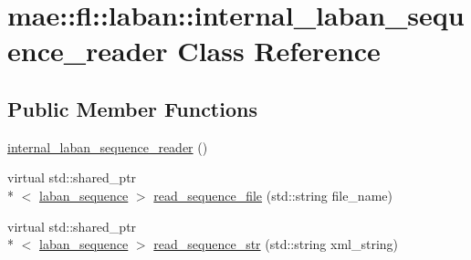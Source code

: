 \hypertarget{classmae_1_1fl_1_1laban_1_1internal__laban__sequence__reader}{\section{mae\-:\-:fl\-:\-:laban\-:\-:internal\-\_\-laban\-\_\-sequence\-\_\-reader Class Reference}
\label{classmae_1_1fl_1_1laban_1_1internal__laban__sequence__reader}
}
\subsection*{Public Member Functions}
\begin{DoxyCompactItemize}
\item 
\hyperlink{classmae_1_1fl_1_1laban_1_1internal__laban__sequence__reader_a80ff5a02252410d4dad9da17df4f5f2d}{internal\-\_\-laban\-\_\-sequence\-\_\-reader} ()
\item 
virtual std\-::shared\-\_\-ptr\\*
$<$ \hyperlink{classmae_1_1fl_1_1laban_1_1laban__sequence}{laban\-\_\-sequence} $>$ \hyperlink{classmae_1_1fl_1_1laban_1_1internal__laban__sequence__reader_ab05a0e062ca400073da5c09e03a5a499}{read\-\_\-sequence\-\_\-file} (std\-::string file\-\_\-name)
\item 
virtual std\-::shared\-\_\-ptr\\*
$<$ \hyperlink{classmae_1_1fl_1_1laban_1_1laban__sequence}{laban\-\_\-sequence} $>$ \hyperlink{classmae_1_1fl_1_1laban_1_1internal__laban__sequence__reader_a6eefd0fb71a9c7828119976ca0a056ed}{read\-\_\-sequence\-\_\-str} (std\-::string xml\-\_\-string)
\end{DoxyCompactItemize}
